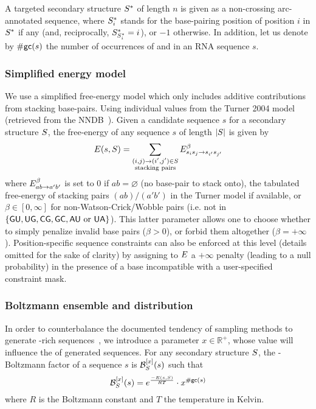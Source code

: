 A targeted secondary structure ${S}^*$ of length $n$ is given as a non-crossing arc-annotated sequence,  where 
${S}^*_i$ stands for the base-pairing position of position $i$ in ${S}^*$ if any (and, reciprocally, ${S}^*_{{S}^*_i}=i$), or $-1$ otherwise. 
In addition, let us denote by ${\#\text{{\sf gc}}}(s)$ the number of occurrences of \Gb and \Cb in an RNA sequence $s$.

\subsubsection{Simplified energy model}
We use a simplified free-energy model which only includes additive contributions from stacking base-pairs. Using individual values from the Turner 2004 model (retrieved from the NNDB~\citep{Turner2010}). Given a candidate sequence $s$ for a secondary structure ${S}$, the free-energy of any sequence $s$ of length $|{S}|$  is given by
\begin{align*}
  {{E}}(s,{S}) = \sum_{\substack{(i,j)\to (i',j')\in {S}\\ \text{stacking pairs}}}{{E}}^{\beta}_{s_is_j\to s_{i'}s_{j'}} 
\end{align*}
where ${{E}}^{\beta}_{ab\to a'b'}$ is set to $0$ if $ab=\varnothing$ (no base-pair to stack onto), the tabulated free-energy of stacking pairs $(ab)/(a'b')$ in the Turner model if available, or $\beta\in[0,\infty]$ for non-Watson-Crick/Wobble pairs (i.e. not in $\{{\sf{G}}{\sf{U}},{\sf{U}}{\sf{G}},{\sf{C}}{\sf{G}},{\sf{G}}{\sf{C}}, {\sf{A}}{\sf{U}}\text{ or }{\sf{U}}{\sf{A}}\}$). This latter parameter allows one to choose whether to simply penalize invalid base pairs ($\beta>0$), or forbid them altogether ($\beta = +\infty$). 
Position-specific sequence constraints can also be enforced at this level (details omitted for the sake of clarity) by assigning to ${{E}}$ a $+\infty$ penalty (leading to a null probability) in the presence of a base incompatible with a user-specified constraint mask.


\subsubsection{\GCWeighted Boltzmann ensemble and distribution}

In order to counterbalance the documented tendency of sampling methods to generate \Gb\Cb-rich sequences~\citep{Levin:2012kx}, we introduce a parameter $x\in\mathbb{R}^+$, whose value will influence the \GCContent of generated sequences. For any secondary structure ${S}$, the \GCWeighted-Boltzmann factor of a sequence $s$ is $\mathcal{B}^{[x]}_{{S}}(s)$  such that
\begin{equation}
\mathcal{B}_{{S}}^{[x]}(s) = e^{\frac{-{{E}}(s,{S})}{RT}}\cdot x^{{\#\text{{\sf gc}}}(s)}
\label{def:genBoltz}
\end{equation}
where $R$ is the Boltzmann constant and $T$ the temperature in Kelvin.

